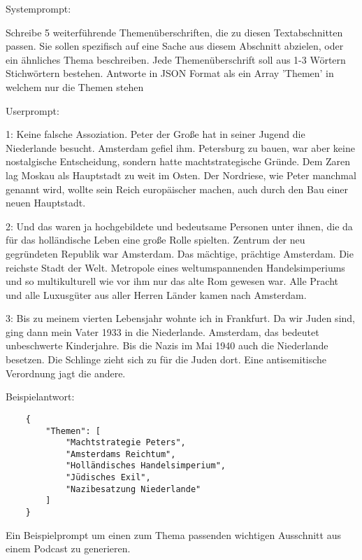 Systemprompt:
\begin{itshape}
    Schreibe 5 weiterführende Themenüberschriften, die zu diesen Textabschnitten passen.
    Sie sollen spezifisch auf eine Sache aus diesem Abschnitt abzielen, oder ein ähnliches Thema beschreiben. 
    Jede Themenüberschrift soll aus 1-3 Wörtern Stichwörtern bestehen.
    Antworte in JSON Format als ein Array 'Themen' in welchem nur die Themen stehen 
\end{itshape}

Userprompt:

\begin{itshape}
    1: Keine falsche Assoziation. Peter der Große hat in seiner Jugend die Niederlande besucht. Amsterdam gefiel ihm. Petersburg zu bauen, war aber keine nostalgische Entscheidung, sondern hatte machtstrategische Gründe. Dem Zaren lag Moskau als Hauptstadt zu weit im Osten. Der Nordriese, wie Peter manchmal genannt wird, wollte sein Reich europäischer machen, auch durch den Bau einer neuen Hauptstadt.
    
    2: Und das waren ja hochgebildete und bedeutsame Personen unter ihnen, die da für das holländische Leben eine große Rolle spielten. Zentrum der neu gegründeten Republik war Amsterdam. Das mächtige, prächtige Amsterdam. Die reichste Stadt der Welt. Metropole eines weltumspannenden Handelsimperiums und so multikulturell wie vor ihm nur das alte Rom gewesen war. Alle Pracht und alle Luxusgüter aus aller Herren Länder kamen nach Amsterdam.
    
    3: Bis zu meinem vierten Lebensjahr wohnte ich in Frankfurt. Da wir Juden sind, ging dann mein Vater 1933 in die Niederlande. Amsterdam, das bedeutet unbeschwerte Kinderjahre. Bis die Nazis im Mai 1940 auch die Niederlande besetzen. Die Schlinge zieht sich zu für die Juden dort. Eine antisemitische Verordnung jagt die andere.
\end{itshape}

Beispielantwort:

\begin{verbatim}
    {
        "Themen": [
            "Machtstrategie Peters",
            "Amsterdams Reichtum",
            "Holländisches Handelsimperium",
            "Jüdisches Exil",
            "Nazibesatzung Niederlande"
        ]
    }
\end{verbatim}


\label{ch:chatgpt-boundaries}

Ein Beispielprompt um einen zum Thema passenden wichtigen Ausschnitt aus einem Podcast zu generieren.

